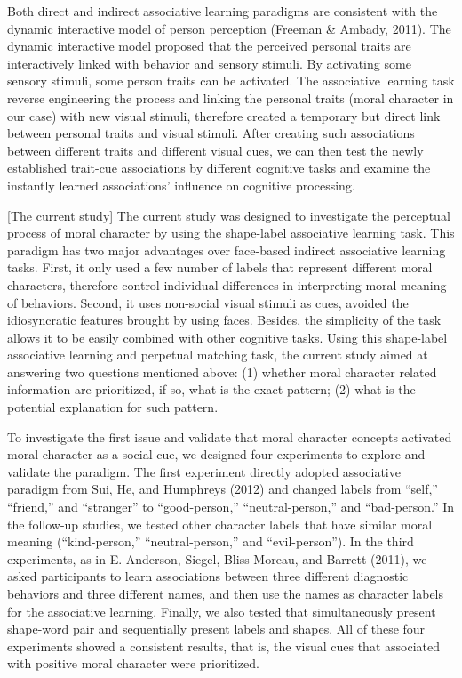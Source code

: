 \documentclass[
  english,
  man]{apa6}
\begin{document}
Both direct and indirect associative learning paradigms are consistent with the dynamic interactive model of person perception (Freeman \& Ambady, 2011). The dynamic interactive model proposed that the perceived personal traits are interactively linked with behavior and sensory stimuli. By activating some sensory stimuli, some person traits can be activated. The associative learning task reverse engineering the process and linking the personal traits (moral character in our case) with new visual stimuli, therefore created a temporary but direct link between personal traits and visual stimuli. After creating such associations between different traits and different visual cues, we can then test the newly established trait-cue associations by different cognitive tasks and examine the instantly learned associations' influence on cognitive processing.

{[}The current study{]}
The current study was designed to investigate the perceptual process of moral character by using the shape-label associative learning task. This paradigm has two major advantages over face-based indirect associative learning tasks. First, it only used a few number of labels that represent different moral characters, therefore control individual differences in interpreting moral meaning of behaviors. Second, it uses non-social visual stimuli as cues, avoided the idiosyncratic features brought by using faces. Besides, the simplicity of the task allows it to be easily combined with other cognitive tasks. Using this shape-label associative learning and perpetual matching task, the current study aimed at answering two questions mentioned above: (1) whether moral character related information are prioritized, if so, what is the exact pattern; (2) what is the potential explanation for such pattern.

To investigate the first issue and validate that moral character concepts activated moral character as a social cue, we designed four experiments to explore and validate the paradigm. The first experiment directly adopted associative paradigm from Sui, He, and Humphreys (2012) and changed labels from ``self,'' ``friend,'' and ``stranger'' to ``good-person,'' ``neutral-person,'' and ``bad-person.'' In the follow-up studies, we tested other character labels that have similar moral meaning (``kind-person,'' ``neutral-person,'' and ``evil-person''). In the third experiments, as in E. Anderson, Siegel, Bliss-Moreau, and Barrett (2011), we asked participants to learn associations between three different diagnostic behaviors and three different names, and then use the names as character labels for the associative learning. Finally, we also tested that simultaneously present shape-word pair and sequentially present labels and shapes. All of these four experiments showed a consistent results, that is, the visual cues that associated with positive moral character were prioritized.
\end{document}
